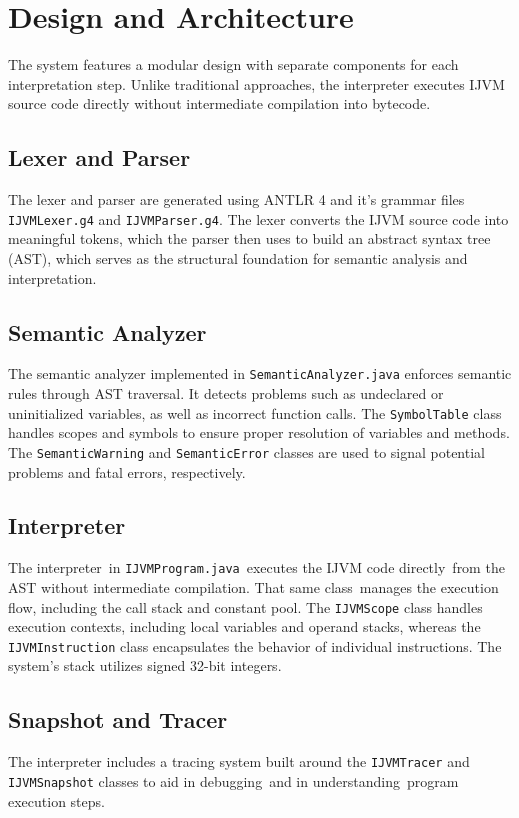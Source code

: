 \documentclass[11pt]{article}
\begin{document}
\section{Design and Architecture}
The system features a modular design with separate components for each interpretation step. Unlike traditional approaches, the interpreter executes IJVM source code directly without intermediate compilation into bytecode.

\subsection{Lexer and Parser}
The lexer and parser are generated using ANTLR 4 and it's grammar files \texttt{IJVMLexer.g4} and \texttt{IJVMParser.g4}.  The lexer converts the IJVM source code into meaningful tokens, which the parser then uses to build an abstract syntax tree (AST), which serves as the structural foundation for semantic analysis and interpretation.

\subsection{Semantic Analyzer}
The semantic analyzer implemented in \texttt{SemanticAnalyzer.java} enforces semantic rules through AST traversal. It detects problems such as undeclared or uninitialized variables, as well as incorrect function calls. The \texttt{SymbolTable} class handles scopes and symbols to ensure proper resolution of variables and methods. The \texttt{SemanticWarning} and \texttt{SemanticError} classes are used to signal potential problems and fatal errors, respectively.

\subsection{Interpreter}
The interpreter in \texttt{IJVMProgram.java} executes the IJVM code directly from the AST without intermediate compilation. That same class manages the execution flow, including the call stack and constant pool. The \texttt{IJVMScope} class handles execution contexts, including local variables and operand stacks, whereas the \texttt{IJVMInstruction} class encapsulates the behavior of individual instructions.  The system's stack utilizes signed 32-bit integers.

\subsection{Snapshot and Tracer}
 The interpreter includes a tracing system built around the \texttt{IJVMTracer} and \texttt{IJVMSnapshot} classes to aid in debugging and in understanding program execution steps.
\end{document}
